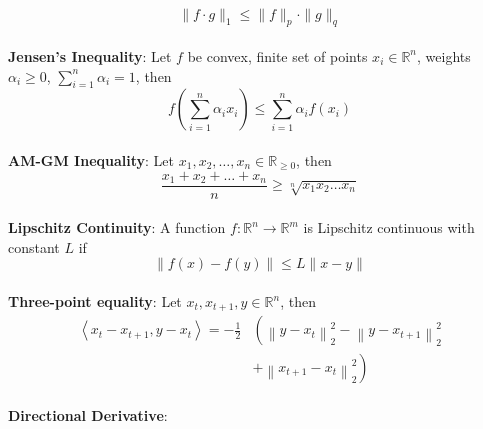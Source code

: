 {\begin{theorem}[]{}
    \vspace{-5pt}\\
    \begin{equation*}
        \|f \cdot g\|_1 \leq \|f\|_p \cdot \|g\|_q
    \end{equation*}
    \vspace{-5pt}\\
    \textbf{Jensen's Inequality}:
    Let $f$ be convex, finite set of points $x_i \in \mathbb{R}^n$, weights $\alpha_i \geq 0$, $\sum_{i=1}^{n}\alpha_i = 1$, then
    \vspace{-5pt}\\
    \begin{equation*}
        f\left(\sum_{i=1}^{n}\alpha_ix_i\right) \leq \sum_{i=1}^{n}\alpha_if(x_i)
    \end{equation*}
    \vspace{-5pt}\\
    \textbf{AM-GM Inequality}:
    Let $x_1, x_2, \ldots, x_n \in \mathbb{R}_{\geq0}$, then
    \vspace{-5pt}\\
    \begin{equation*}
        \frac{x_1 + x_2 + \ldots + x_n}{n} \geq \sqrt[n]{x_1x_2\ldots x_n}
    \end{equation*}
    \vspace{-5pt}\\
    \textbf{Lipschitz Continuity}:
    A function $f: \mathbb{R}^n \rightarrow \mathbb{R}^m$ is Lipschitz continuous with constant $L$ if
    \vspace{-5pt}\\
    \begin{equation*}
        \|f(x) - f(y)\| \leq L\|x - y\|
    \end{equation*}
    \vspace{-5pt}\\
    \textbf{Three-point equality}:
    Let $x_t, x_{t+1}, y \in \mathbb{R}^n$, then
    \vspace{-5pt}\\
    $$
    \begin{aligned}
        \left\langle x_t-x_{t+1}, y-x_t\right\rangle=-\frac{1}{2}&\left(\left\|y-x_t\right\|_2^2-\left\|y-x_{t+1}\right\|_2^2 \right.\\
        & \left. +\left\|x_{t+1}-x_t\right\|_2^2\right)
    \end{aligned}
    $$
    \vspace{-3pt}\\
    \textbf{Directional Derivative}:

\end{theorem}}
